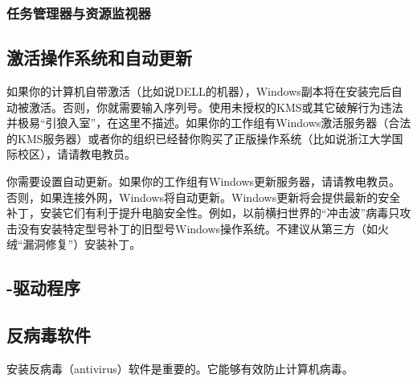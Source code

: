 \subsubsection{任务管理器与资源监视器}
\subsection{激活操作系统和自动更新}
如果你的计算机自带激活（比如说DELL的机器），Windows副本将在安装完后自动被激活。否则，你就需要输入序列号。使用未授权的KMS或其它破解行为违法并极易“引狼入室”，在这里不描述。如果你的工作组有Windows激活服务器（合法的KMS服务器）或者你的组织已经替你购买了正版操作系统（比如说浙江大学国际校区），请请教电教员。\par
你需要设置自动更新。如果你的工作组有Windows更新服务器，请请教电教员。否则，如果连接外网，Windows将自动更新。Windows更新将会提供最新的安全补丁，安装它们有利于提升电脑安全性。例如，以前横扫世界的“冲击波”病毒只攻击没有安装特定型号补丁的旧型号Windows操作系统。不建议从第三方（如火绒“漏洞修复”）安装补丁。
\subsection{-驱动程序}
\subsection{反病毒软件}
安装反病毒（antivirus）软件是重要的。它能够有效防止计算机病毒。
